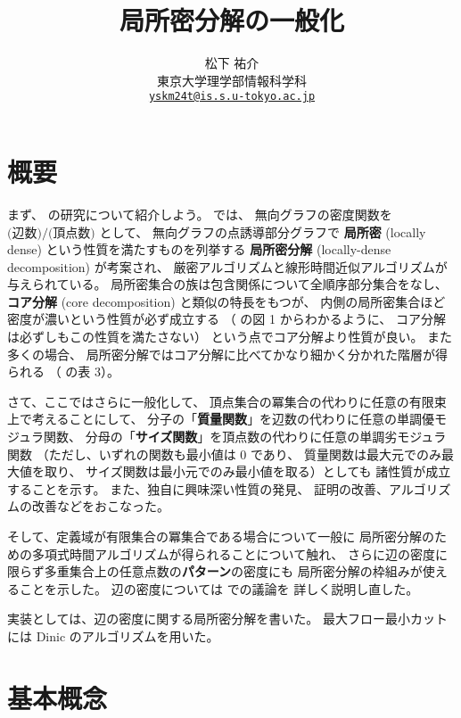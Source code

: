 ﻿\documentclass[dvipdfmx, uplatex, 14pt]{jsarticle}
\title{局所密分解の一般化}
\author{松下 祐介 \\\protect \small
東京大学理学部情報科学科 \\\protect \small
\href{mailto:yskm24t@is.s.u-tokyo.ac.jp}
{\nolinkurl{yskm24t@is.s.u-tokyo.ac.jp}}}
\begin{document}
\maketitle

\section{概要}

まず、\citet{tatti-gionis} の研究について紹介しよう。
\citet{tatti-gionis} では、
無向グラフの密度関数を \(\text{(辺数)} / \text{(頂点数)}\) として、
無向グラフの点誘導部分グラフで
\textbf{局所密} (locally dense) という性質を満たすものを列挙する
\textbf{局所密分解} (locally-dense decomposition) が考案され、
厳密アルゴリズムと線形時間近似アルゴリズムが与えられている。
局所密集合の族は包含関係について全順序部分集合をなし、
\textbf{コア分解} (core decomposition) と類似の特長をもつが、
内側の局所密集合ほど密度が濃いという性質が必ず成立する
（\citet{tatti-gionis} の図 1 からわかるように、
コア分解は必ずしもこの性質を満たさない）
という点でコア分解より性質が良い。
また多くの場合、
局所密分解ではコア分解に比べてかなり細かく分かれた階層が得られる
（\citet{tatti-gionis} の表 3）。

さて、ここではさらに一般化して、
頂点集合の冪集合の代わりに任意の有限束上で考えることにして、
分子の「\textbf{質量関数}」を辺数の代わりに任意の単調優モジュラ関数、
分母の「\textbf{サイズ関数}」を頂点数の代わりに任意の単調劣モジュラ関数
（ただし、いずれの関数も最小値は 0 であり、
質量関数は最大元でのみ最大値を取り、
サイズ関数は最小元でのみ最小値を取る）としても
諸性質が成立することを示す。
また、独自に興味深い性質の発見、
証明の改善、アルゴリズムの改善などをおこなった。

そして、定義域が有限集合の冪集合である場合について一般に
局所密分解のための多項式時間アルゴリズムが得られることについて触れ、
さらに辺の密度に限らず多重集合上の任意点数の\textbf{パターン}の密度にも
局所密分解の枠組みが使えることを示した。
辺の密度については \citet{tatti-gionis} での議論を
詳しく説明し直した。

実装としては、辺の密度に関する局所密分解を書いた。
最大フロー最小カットには Dinic のアルゴリズムを用いた。

\section{基本概念}
\end{document}

